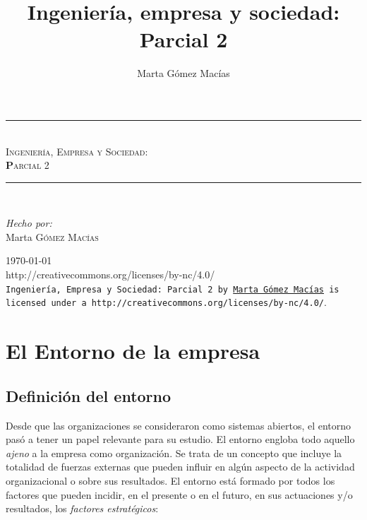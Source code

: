 \documentclass[10pt,a4paper,spanish]{report}
\title{Ingeniería, empresa y sociedad: \\ Parcial 2}
\author{Marta Gómez Macías}
\newcommand{\HRule}{\rule{\linewidth}{0.5mm}} %
\begin{document}
      \begin{titlepage}
            \begin{center}
                  \HRule \\[0.4cm]
                  \textsc{\LARGE \textcolor[rgb]{0.2,0.8,0.4}Ingeniería, \textcolor[rgb]{0.5,0.1,0.5}Empresa y \textcolor[rgb]{0.7,0.8,0.9}Sociedad:}\\[1.5cm]
                  \textsc{\Large \textbf{P}arcial 2}\\[0.5cm]
                  \HRule \\[1.5cm]
                  \begin{flushleft}
                        \emph{Hecho por:}\\
                        Marta \textsc{Gómez Macías}
                  \end{flushleft}
                  \vspace{10cm}
                  {\Large \today}
                  \vspace{5mm}
                  \\
            {http://creativecommons.org/licenses/by-nc/4.0/}\\
            \texttt{Ingeniería, Empresa y Sociedad: Parcial 2 by 
            \href{mailto:mgmacias95@gmail.com}{Marta Gómez Macías}
            is licensed under a 
            {http://creativecommons.org/licenses/by-nc/4.0/}}.
            \end{center}
      \end{titlepage}

      \setcounter{chapter}{4}

      \tableofcontents

\chapter{\textcolor[rgb]{0.3,0.4,0.6}{El Entorno de la empresa}}
      \section{\textcolor[rgb]{0.3,0.4,0.6}Definición del entorno}
            Desde que las organizaciones se consideraron como sistemas abiertos, el entorno pasó a tener un papel relevante para su estudio. El entorno engloba todo aquello \textit{\textcolor[rgb]{0.3,0.4,0.6}{ajeno}} a la empresa como organización. Se trata de un concepto que incluye la totalidad de fuerzas externas que pueden influir en algún aspecto de la actividad organizacional o sobre sus resultados. El entorno está formado por todos los factores que pueden incidir, en el presente o en el futuro, en sus actuaciones y/o resultados, los \textit{\textcolor[rgb]{0.3,0.4,0.6}{factores estratégicos}}:
\end{document}
